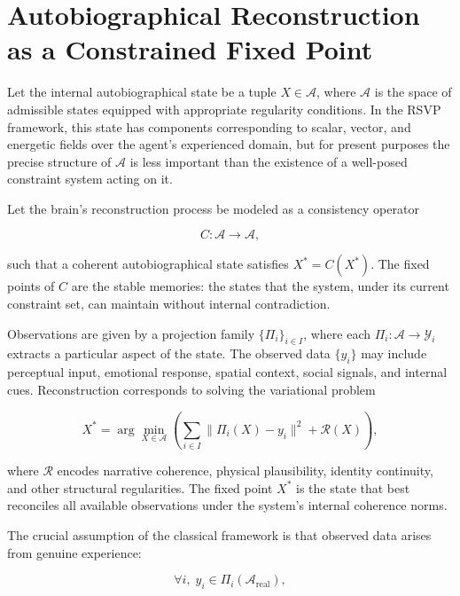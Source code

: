 \documentclass[12pt, letterpaper]{article}
\theoremstyle{flyxion}
\begin{document}
\section{Autobiographical Reconstruction as a Constrained Fixed Point}

Let the internal autobiographical state be a tuple $X \in \mathcal{A}$, where $\mathcal{A}$ is the space of admissible states equipped with appropriate regularity conditions. In the RSVP framework, this state has components corresponding to scalar, vector, and energetic fields over the agent's experienced domain, but for present purposes the precise structure of $\mathcal{A}$ is less important than the existence of a well-posed constraint system acting on it.

Let the brain's reconstruction process be modeled as a consistency operator

\begin{equation}
C : \mathcal{A} \to \mathcal{A},
\end{equation}

such that a coherent autobiographical state satisfies $X^* = C(X^*)$. The fixed points of $C$ are the stable memories: the states that the system, under its current constraint set, can maintain without internal contradiction.

Observations are given by a projection family $\{\Pi_i\}_{i \in I}$, where each $\Pi_i : \mathcal{A} \to \mathcal{Y}_i$ extracts a particular aspect of the state. The observed data $\{y_i\}$ may include perceptual input, emotional response, spatial context, social signals, and internal cues. Reconstruction corresponds to solving the variational problem

\begin{equation}
X^* = \arg\min_{X \in \mathcal{A}} \left( \sum_{i \in I} \|\Pi_i(X) - y_i\|^2 + \mathcal{R}(X) \right),
\end{equation}

where $\mathcal{R}$ encodes narrative coherence, physical plausibility, identity continuity, and other structural regularities. The fixed point $X^*$ is the state that best reconciles all available observations under the system's internal coherence norms.

The crucial assumption of the classical framework is that observed data arises from genuine experience:

\begin{equation}
\forall i, \; y_i \in \Pi_i(\mathcal{A}_\mathrm{real}),
\end{equation}
\end{document}
